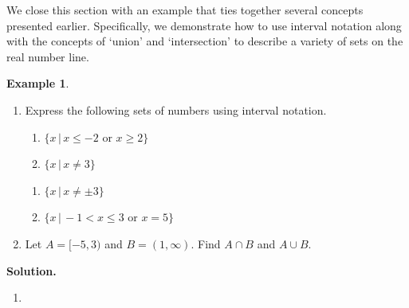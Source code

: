 \documentclass[11pt]{article}
\theoremstyle{definition}  %
\newtheorem{ex}{\bf Example}
\newcounter{HW}
\begin{document}
\medskip

We close this section with an example that ties together several concepts presented earlier.  Specifically, we demonstrate how to use interval notation along with the concepts of `union' and `intersection' to describe a variety of sets on the real number line.

\begin{ex} \label{intervalex} $~$

\begin{enumerate} \item Express the following sets of numbers using interval notation.

\begin{multicols}{2}

\begin{enumerate}

\item  $\{ x \, | \, x \leq -2 \, \, \text{or} \, \,  x \geq 2 \}$

\item  $\{ x \, | \, x \neq 3 \}$

\setcounter{HW}{\value{enumii}}

\end{enumerate}

\end{multicols}

\begin{multicols}{2}

\begin{enumerate}

\setcounter{enumii}{\value{HW}}

\item  $\{ x \, | \, x \neq \pm 3 \}$

\item  $\{ x \, | \, -1 < x \leq 3 \,\, \text{or} \,\, x = 5\}$

\end{enumerate}

\end{multicols}

\item  Let $A = [-5,3)$ and $B = (1, \infty)$.  Find  $A \cap B$ and $A\cup B$. 

\end{enumerate}


{\bf Solution.}

\begin{enumerate}

\item 


\end{enumerate}
\end{ex}
\end{document}
